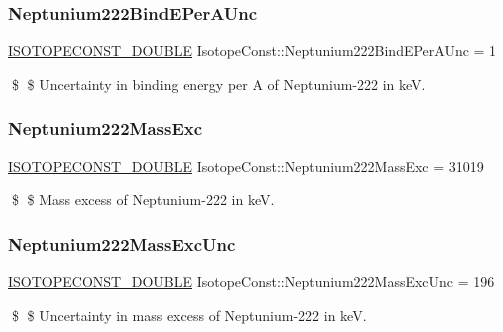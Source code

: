 \subsubsection{\texorpdfstring{Neptunium222\+Bind\+E\+Per\+A\+Unc}{Neptunium222BindEPerAUnc}}
{\footnotesize\ttfamily \mbox{\hyperlink{group___isotope_const-_macros_ga8f45a7272ce02c0b4c65c44636ed719a}{I\+S\+O\+T\+O\+P\+E\+C\+O\+N\+S\+T\+\_\+\+D\+O\+U\+B\+LE}} Isotope\+Const\+::\+Neptunium222\+Bind\+E\+Per\+A\+Unc = 1}

\$ \$ Uncertainty in binding energy per A of Neptunium-\/222 in keV. \mbox{\label{group___isotope_const-_neptunium-_np222_gaef02964f2b8ac6aec340d43e4866d48a}} 
\subsubsection{\texorpdfstring{Neptunium222\+Mass\+Exc}{Neptunium222MassExc}}
{\footnotesize\ttfamily \mbox{\hyperlink{group___isotope_const-_macros_ga8f45a7272ce02c0b4c65c44636ed719a}{I\+S\+O\+T\+O\+P\+E\+C\+O\+N\+S\+T\+\_\+\+D\+O\+U\+B\+LE}} Isotope\+Const\+::\+Neptunium222\+Mass\+Exc = 31019}

\$ \$ Mass excess of Neptunium-\/222 in keV. \mbox{\label{group___isotope_const-_neptunium-_np222_ga8cd74d4151a2b87810fe679891c10d28}} 
\subsubsection{\texorpdfstring{Neptunium222\+Mass\+Exc\+Unc}{Neptunium222MassExcUnc}}
{\footnotesize\ttfamily \mbox{\hyperlink{group___isotope_const-_macros_ga8f45a7272ce02c0b4c65c44636ed719a}{I\+S\+O\+T\+O\+P\+E\+C\+O\+N\+S\+T\+\_\+\+D\+O\+U\+B\+LE}} Isotope\+Const\+::\+Neptunium222\+Mass\+Exc\+Unc = 196}

\$ \$ Uncertainty in mass excess of Neptunium-\/222 in keV. \mbox{\label{group___isotope_const-_neptunium-_np222_ga33c7014d1e40f2935347b86a2b454bc3}} 
